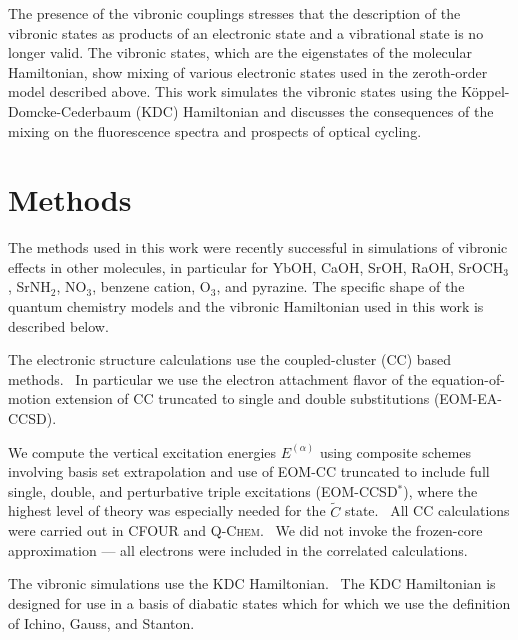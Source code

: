 \documentclass{article}
\begin{document}
The presence of the vibronic couplings stresses that the description of the
vibronic states as products of an electronic state and a vibrational state is
no longer valid. The vibronic states, which are the eigenstates of the
molecular Hamiltonian, show mixing of various electronic states used in the
zeroth-order model described above. This work simulates the vibronic states
using the K\"oppel-Domcke-Cederbaum (KDC) Hamiltonian and discusses the
consequences of the mixing on the fluorescence spectra and prospects of optical
cycling.

\section{Methods}
\label{sec:methods}

The methods used in this work were recently successful in simulations of
vibronic effects in other molecules, in particular for YbOH, CaOH, SrOH, RaOH,
SrOCH$_3$, SrNH$_2$, NO$_3$, benzene cation, O$_3$, and
pyrazine.\autocite{Doyle:YbOH:20, zhangAccuratePredictionMeasurement2021,
Doyle:SrOH:22, zhangIntensityborrowingMechanismsPertinent2023,
frenettVibrationalBranchingFractions2024, Stanton:NO3:07, Koppel:02,
Wojcik:ozone:2024} The specific shape of the quantum chemistry models and the
vibronic Hamiltonian used in this work is described below.

The electronic structure calculations use the coupled-cluster (CC) based
methods.~\autocite{Bartlett:CC_review:07} In particular we use the electron
attachment flavor of the equation-of-motion extension of CC truncated to single
and double substitutions (EOM-EA-CCSD).~\autocite{Krylov:EOMRev:07,
Bartlett:Book:09, Christiansen:EOMRev:11, Bartlet:EOMRev:12, Krylov:OSRev}

We compute the vertical excitation energies $E ^{(\alpha)}$ using composite
schemes involving basis set extrapolation and use of EOM-CC truncated to
include full single, double, and perturbative triple excitations
(EOM-CCSD$^*$), where the highest level of theory was especially needed for the
$\tilde{C}$ state.~\autocite{StantonGauss:SD3:96} All CC calculations were
carried out in \textsc{CFOUR} and \textsc{Q-Chem}.~\autocite{cfour, cfour:2020,
qchem_feature, qchem5_full} We did not invoke the frozen-core approximation ---
all electrons were included in the correlated calculations.

The vibronic simulations use the KDC Hamiltonian.~\autocite{Cederbaum:LVC:84,
KDC:81, Koppel:CIbookCh7:04} The KDC Hamiltonian is designed for use in a basis
of diabatic states which for which we use the definition of Ichino, Gauss, and
Stanton.~\autocite{Stanton:EOMIPdeg:09} 
\end{document}
